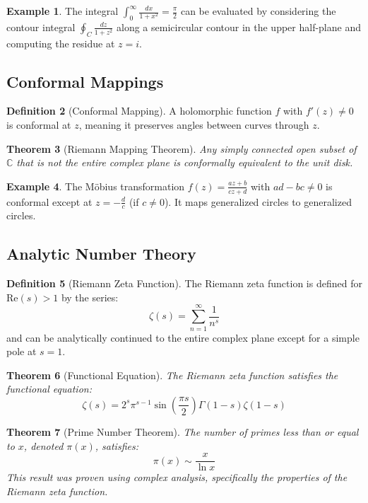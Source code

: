\documentclass[12pt,a4paper]{article}
\theoremstyle{plain}
\newtheorem{theorem}{Theorem}[section]
\theoremstyle{definition}
\newtheorem{definition}[theorem]{Definition}
\newtheorem{example}[theorem]{Example}
\begin{document}
\begin{example}
The integral $\int_{0}^{\infty} \frac{dx}{1+x^2} = \frac{\pi}{2}$ can be evaluated by considering the contour integral $\oint_C \frac{dz}{1+z^2}$ along a semicircular contour in the upper half-plane and computing the residue at $z = i$.
\end{example}

\subsection{Conformal Mappings}

\begin{definition}[Conformal Mapping]
A holomorphic function $f$ with $f'(z) \neq 0$ is conformal at $z$, meaning it preserves angles between curves through $z$.
\end{definition}

\begin{theorem}[Riemann Mapping Theorem]
Any simply connected open subset of $\mathbb{C}$ that is not the entire complex plane is conformally equivalent to the unit disk.
\end{theorem}

\begin{example}
The Möbius transformation $f(z) = \frac{az+b}{cz+d}$ with $ad-bc \neq 0$ is conformal except at $z = -\frac{d}{c}$ (if $c \neq 0$). It maps generalized circles to generalized circles.
\end{example}

\subsection{Analytic Number Theory}

\begin{definition}[Riemann Zeta Function]
The Riemann zeta function is defined for $\text{Re}(s) > 1$ by the series:
\[\zeta(s) = \sum_{n=1}^{\infty} \frac{1}{n^s}\]
and can be analytically continued to the entire complex plane except for a simple pole at $s = 1$.
\end{definition}

\begin{theorem}[Functional Equation]
The Riemann zeta function satisfies the functional equation:
\[\zeta(s) = 2^s \pi^{s-1} \sin\left(\frac{\pi s}{2}\right) \Gamma(1-s) \zeta(1-s)\]
\end{theorem}

\begin{theorem}[Prime Number Theorem]
The number of primes less than or equal to $x$, denoted $\pi(x)$, satisfies:
\[\pi(x) \sim \frac{x}{\ln x}\]
This result was proven using complex analysis, specifically the properties of the Riemann zeta function.
\end{theorem}
\end{document}
